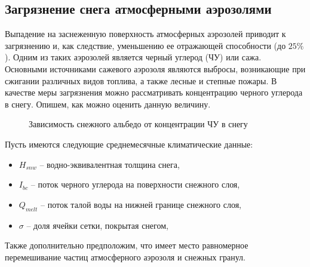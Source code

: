 \documentclass[a4paper, fontsize=14pt]{scrartcl}
\begin{document}
\subsection{Загрязнение снега атмосферными аэрозолями}

Выпадение на заснеженную поверхность атмосферных аэрозолей приводит к загрязнению и, как следствие,  уменьшению ее отражающей способности (до $25 \%$). Одним из таких аэрозолей является черный углерод (ЧУ) или сажа. Основными источниками сажевого аэрозоля являются выбросы, возникающие при сжигании различных видов топлива, а также лесные и степные пожары. В качестве меры загрязнения можно рассматривать концентрацию черного углерода в снегу. Опишем, как можно оценить данную величину.

\begin{figure}[h]
    \caption{Зависимость снежного альбедо от концентрации ЧУ в снегу}
    \label{fig:image}
\end{figure}

\newpage
Пусть имеются следующие среднемесячные климатические данные:
\begin{itemize}
    \item $H_{snw}$ -- водно-эквивалентная толщина снега, 
    \item $I_{bc}$ -- поток черного углерода на поверхности снежного слоя, 
    \item $Q_{melt}$ -- поток талой воды на нижней границе снежного слоя,
    \item $\sigma$ -- доля ячейки сетки, покрытая снегом,
\end{itemize} 
Также дополнительно предположим, что имеет место равномерное перемешивание частиц атмосферного аэрозоля и снежных гранул.
\end{document}
